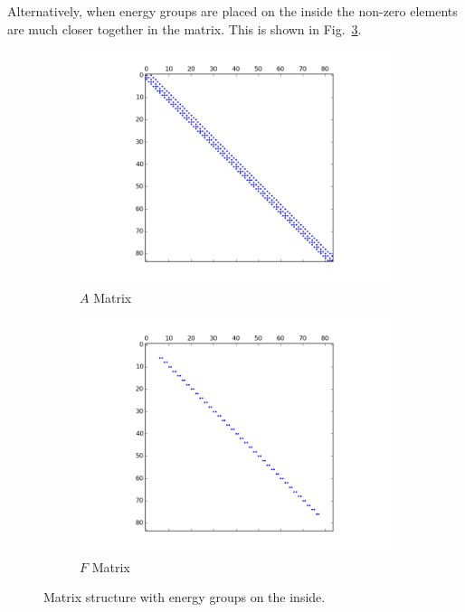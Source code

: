 \documentclass[12pt]{report}
\begin{document}
	
	Alternatively, when energy groups are placed on the inside the non-zero elements are much closer together in the matrix. This is shown in Fig.~\ref{fig::groups_inside}.
		\begin{figure}[ht]
			\centering
			\begin{subfigure}{.5\textwidth}
				\centering
				\includegraphics[width=.9\linewidth]{A_gi.png}
				\caption{$A$ Matrix}
				\label{fig:A_gi}
			\end{subfigure}%
			\begin{subfigure}{.5\textwidth}
				\centering
				\includegraphics[width=.9\linewidth]{F_gi.png}
				\caption{$F$ Matrix}
				\label{fig:F_gi}
			\end{subfigure}
			\caption{Matrix structure with energy groups on the inside.}
			\label{fig::groups_inside}
		\end{figure}
		
\end{document}
